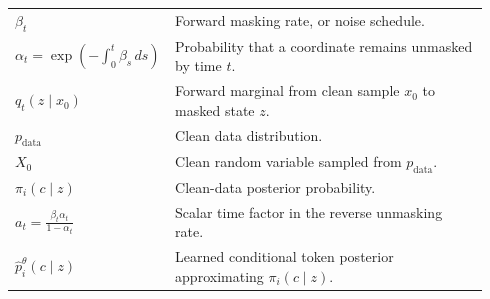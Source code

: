 \documentclass{article}
\begin{document}
\begin{longtable}{p{0.28\linewidth}p{0.66\linewidth}}
\(\beta_t\) & Forward masking rate, or noise schedule. \\
\(\alpha_t=\exp(-\int_0^t\beta_s\,ds)\) & Probability that a coordinate remains unmasked by time \(t\). \\
\(q_t(z\mid x_0)\) & Forward marginal from clean sample \(x_0\) to masked state \(z\). \\
\(p_{\mathrm{data}}\) & Clean data distribution. \\
\(X_0\) & Clean random variable sampled from \(p_{\mathrm{data}}\). \\
\(\pi_i(c\mid z)\) & Clean-data posterior probability. \\
\(a_t=\frac{\beta_t\alpha_t}{1-\alpha_t}\) & Scalar time factor in the reverse unmasking rate. \\
\(\widehat p_i^\theta(c\mid z)\) & Learned conditional token posterior approximating \(\pi_i(c\mid z)\). \\




\end{longtable}
\end{document}
